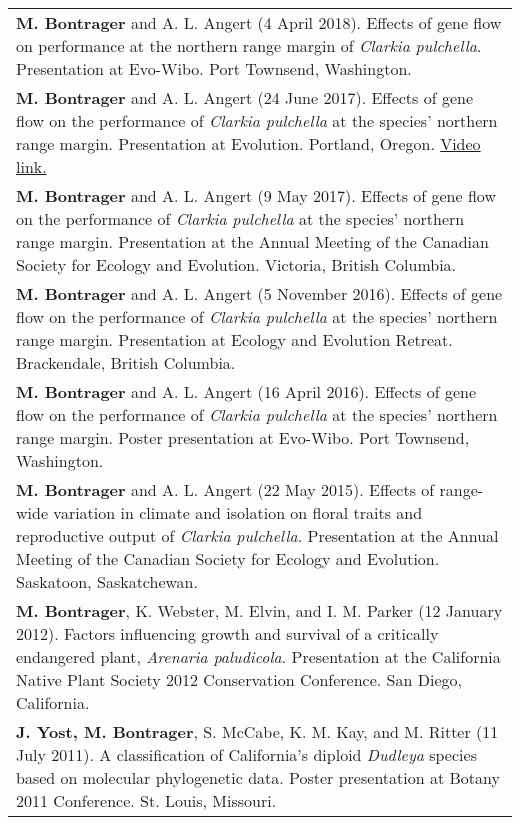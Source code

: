 \documentclass[letterpaper,11pt,oneside]{article}
\begin{document}
\begin{tabular}{@{} >{\raggedright\arraybackslash}p{17.2cm}}
\hangindent=5mm\textbf{M. Bontrager} and A. L. Angert (4 April 2018). Effects of gene flow on performance  at the northern range margin of \textit{Clarkia pulchella}. Presentation at Evo-Wibo. Port Townsend, Washington. \\
\hangindent=5mm\textbf{M. Bontrager} and A. L. Angert (24 June 2017). Effects of gene flow on the performance of \textit{Clarkia pulchella} at the species’ northern range margin. Presentation at Evolution. Portland, Oregon. \href{https://www.youtube.com/watch?v=HqVgQzIJLyA}{Video link.} \\
\hangindent=5mm\textbf{M. Bontrager} and A. L. Angert (9 May 2017). Effects of gene flow on the performance of \textit{Clarkia pulchella} at the species’ northern range margin. Presentation at the Annual Meeting of the Canadian Society for Ecology and Evolution. Victoria, British Columbia. \\
\hangindent=5mm\textbf{M. Bontrager} and A. L. Angert (5 November 2016). Effects of gene flow on the performance of \textit{Clarkia pulchella} at the species’ northern range margin. Presentation at Ecology and Evolution Retreat. Brackendale, British Columbia. \\
\hangindent=5mm\textbf{M. Bontrager} and A. L. Angert (16 April 2016). Effects of gene flow on the performance of \textit{Clarkia pulchella} at the species’ northern range margin. Poster presentation at Evo-Wibo. Port Townsend, Washington. \\
\hangindent=5mm\textbf{M. Bontrager} and A. L. Angert (22 May 2015). Effects of range-wide variation in climate and isolation on floral traits and reproductive output of \textit{Clarkia pulchella}. Presentation at the Annual Meeting of the Canadian Society for Ecology and Evolution. Saskatoon, Saskatchewan. \\
\hangindent=5mm\textbf{M. Bontrager}, K. Webster, M. Elvin, and I. M. Parker (12 January 2012). Factors influencing growth and survival of a critically endangered plant, \textit{Arenaria paludicola}. Presentation at the California Native Plant Society 2012 Conservation Conference. San Diego, California. \\
\hangindent=5mm\textbf{J. Yost, M. Bontrager}, S. McCabe, K. M. Kay, and M. Ritter (11 July 2011). A classification of California’s diploid \textit{Dudleya} species based on molecular phylogenetic data. Poster presentation at Botany 2011 Conference. St. Louis, Missouri. \\
\end{tabular}
\bigskip
\end{document}
